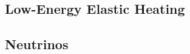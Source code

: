 \documentclass[twocolumn, preprintnumbers,amsmath,amssymb,prd, superscriptaddress]{revtex4}
\newcommand{\OO}{\mathcal{O}}
\newcommand{\MeV}{\text{MeV}}
\def\r{\right)}
\def\l{\left(}
\begin{document}
\subsection{Low-Energy Elastic Heating}

\subsection{Neutrinos}


\end{document}
